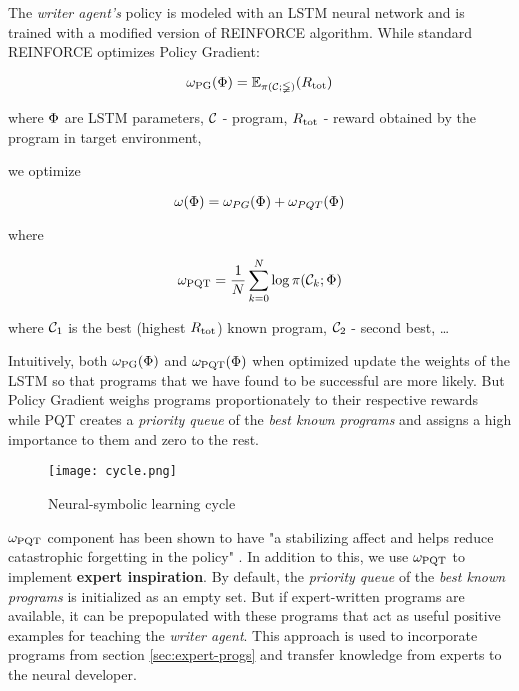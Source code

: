 The \emph{writer agent's} policy is modeled with an LSTM \cite{hochreiterLongShorttermMemory1997} neural network and is trained with a modified version of REINFORCE \cite{williamsSimpleStatisticalGradientfollowing1992}algorithm.
While standard REINFORCE optimizes Policy Gradient:

\begin{equation}
    \omega_{\text{PG}}(\Phi) = \mathbb{E_{\pi(\mathcal{C}; \Phi)}}(R_\text{tot})
\end{equation}

where $\Phi$ are LSTM parameters, $\mathcal{C}$ - program, $R_\text{tot}$ - reward obtained by the program in target environment,

we optimize

\begin{equation}
    \omega(\Phi)=\omega_{PG}(\Phi)+\omega_{PQT}(\Phi)
\end{equation}

where

\begin{equation}
    \omega_{\text{PQT}} = \frac{1}{N} \sum_{k=0}^N \log \pi(\mathcal{C}_k; \Phi)
\end{equation}

where $\mathcal{C}_1$ is the best (highest $R_\text{tot}$) known program, $\mathcal{C}_2$ - second best, \dots

Intuitively, both $\omega_{\text{PG}}(\Phi)$ and $\omega_{\text{PQT}}(\Phi)$ when optimized update the weights of the LSTM so that programs that we have found to be successful are more likely.
But Policy Gradient weighs programs proportionately to their respective rewards while PQT creates a \textit{priority queue} of the \textit{best known programs} and assigns a high importance to them and zero to the rest.

\begin{figure}
    \centering
    \texttt{[image: cycle.png]}
    \caption{Neural-symbolic learning cycle \cite{cycle}}
    \label{fig:cycle}
\end{figure}

$\omega_{\text{PQT}}$ component has been shown to have "a stabilizing affect and helps reduce catastrophic forgetting in the policy" \cite{abolafiaNeuralProgramSynthesis2018}.
In addition to this, we use $\omega_{\text{PQT}}$ to implement \textbf{expert inspiration}.
By default, the \textit{priority queue} of the \textit{best known programs} is initialized as an empty set.
But if expert-written programs are available, it can be prepopulated with these programs that act as useful positive examples for teaching the \emph{writer agent}.
This approach is used to incorporate programs from section \ref{sec:expert-progs} and transfer knowledge from experts to the neural developer.

